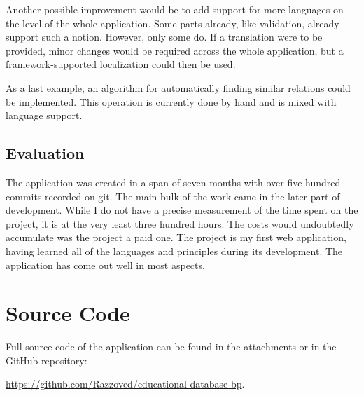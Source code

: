 \documentclass[
  digital,     %
  oneside,     %
  nosansbold,  %
  colorbold, %
  lof,         %
  lot,         %
]{fithesis4}
\begin{document}
Another possible improvement would be to add support for more languages on the level of the whole
application. Some parts already, like validation, already support such a notion. However, only some do.
If a translation were to be provided, minor changes would be required across the whole application,
but a framework-supported localization could then be used.

As a last example, an algorithm for automatically finding similar relations could be implemented. This
operation is currently done by hand and is mixed with language support.

\section{Evaluation}

The application was created in a span of seven months with over five hundred commits recorded on
git. The main bulk of the work came in the later part of development. While I do not have a precise
measurement of the time spent on the project, it is at the very least three hundred hours. The costs
would undoubtedly accumulate was the project a paid one. The project is my first web application,
having learned all of the languages and principles during its development. The application has come
out well in most aspects.

\printbibliography[heading=bibintoc] %


\appendix %
\chapter{Source Code}

Full source code of the application can be found in the attachments or in the GitHub repository:

\url{https://github.com/Razzoved/educational-database-bp}.
\end{document}
